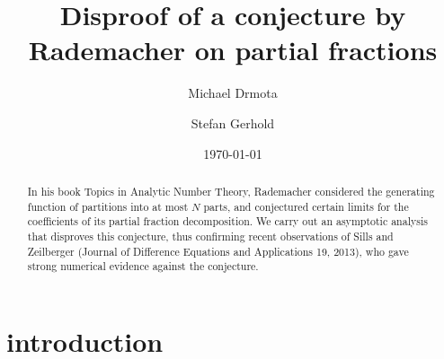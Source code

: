 \documentclass[a4paper]{amsart}
\title{Disproof of a conjecture by Rademacher on partial fractions}
\author{Michael Drmota}
\author{Stefan Gerhold}
\date{\today}
\begin{document}
\begin{abstract}
  In his book Topics in Analytic Number Theory,
  Rademacher considered the generating function
  of partitions into at most $N$ parts, and conjectured certain limits
for the coefficients of its partial fraction decomposition. We carry out an asymptotic
analysis that disproves this conjecture, thus confirming recent observations
of Sills and Zeilberger (Journal of Difference Equations and Applications 19, 2013),
who gave strong  numerical evidence against the conjecture.
\end{abstract}



\maketitle

\section{introduction}
\end{document}
